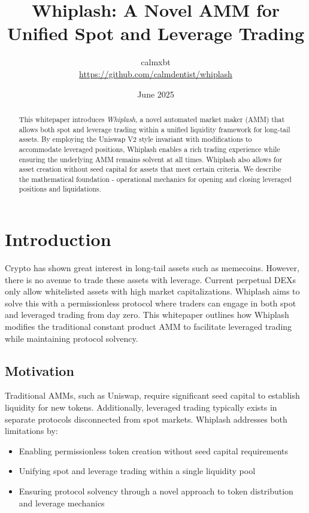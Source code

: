 \documentclass[11pt]{article}
\title{\textbf{Whiplash: A Novel AMM for Unified Spot and Leverage Trading}}
\author{
    calmxbt\\
    \href{https://github.com/calmdentist/whiplash}{https://github.com/calmdentist/whiplash}
}
\date{June 2025}
\begin{document}
\maketitle

\begin{abstract}
This whitepaper introduces \emph{Whiplash}, a novel automated market maker (AMM) that allows both spot and leverage trading within a unified liquidity framework for long-tail assets. By employing the Uniswap V2 style invariant with modifications to accommodate leveraged positions, Whiplash enables a rich trading experience while ensuring the underlying AMM remains solvent at all times. Whiplash also allows for asset creation without seed capital for assets that meet certain criteria. We describe the mathematical foundation - operational mechanics for opening and closing leveraged positions and liquidations.
\end{abstract}

\section{Introduction}

Crypto has shown great interest in long-tail assets such as memecoins. However, there is no avenue to trade these assets with leverage. Current perpetual DEXs only allow whitelisted assets with high market capitalizations. Whiplash aims to solve this with a permissionless protocol where traders can engage in both spot and leveraged trading from day zero. This whitepaper outlines how Whiplash modifies the traditional constant product AMM to facilitate leveraged trading while maintaining protocol solvency.

\subsection{Motivation}
Traditional AMMs, such as Uniswap, require significant seed capital to establish liquidity for new tokens. Additionally, leveraged trading typically exists in separate protocols disconnected from spot markets. Whiplash addresses both limitations by:
\begin{itemize}
    \item Enabling permissionless token creation without seed capital requirements
    \item Unifying spot and leverage trading within a single liquidity pool
    \item Ensuring protocol solvency through a novel approach to token distribution and leverage mechanics
\end{itemize}
\end{document}
